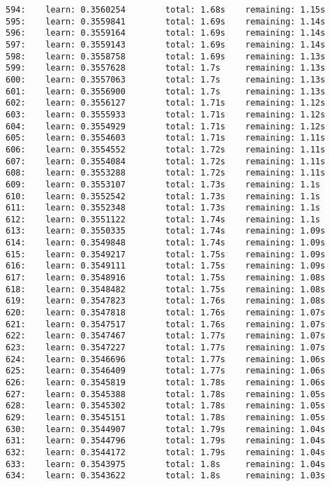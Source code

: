 \documentclass[11pt]{article}
\begin{document}
\begin{Verbatim}[commandchars=\\\{\}]
594:    learn: 0.3560254        total: 1.68s    remaining: 1.15s
595:    learn: 0.3559841        total: 1.69s    remaining: 1.14s
596:    learn: 0.3559164        total: 1.69s    remaining: 1.14s
597:    learn: 0.3559143        total: 1.69s    remaining: 1.14s
598:    learn: 0.3558758        total: 1.69s    remaining: 1.13s
599:    learn: 0.3557628        total: 1.7s     remaining: 1.13s
600:    learn: 0.3557063        total: 1.7s     remaining: 1.13s
601:    learn: 0.3556900        total: 1.7s     remaining: 1.13s
602:    learn: 0.3556127        total: 1.71s    remaining: 1.12s
603:    learn: 0.3555933        total: 1.71s    remaining: 1.12s
604:    learn: 0.3554929        total: 1.71s    remaining: 1.12s
605:    learn: 0.3554603        total: 1.71s    remaining: 1.11s
606:    learn: 0.3554552        total: 1.72s    remaining: 1.11s
607:    learn: 0.3554084        total: 1.72s    remaining: 1.11s
608:    learn: 0.3553288        total: 1.72s    remaining: 1.11s
609:    learn: 0.3553107        total: 1.73s    remaining: 1.1s
610:    learn: 0.3552542        total: 1.73s    remaining: 1.1s
611:    learn: 0.3552348        total: 1.73s    remaining: 1.1s
612:    learn: 0.3551122        total: 1.74s    remaining: 1.1s
613:    learn: 0.3550335        total: 1.74s    remaining: 1.09s
614:    learn: 0.3549848        total: 1.74s    remaining: 1.09s
615:    learn: 0.3549217        total: 1.75s    remaining: 1.09s
616:    learn: 0.3549111        total: 1.75s    remaining: 1.09s
617:    learn: 0.3548916        total: 1.75s    remaining: 1.08s
618:    learn: 0.3548482        total: 1.75s    remaining: 1.08s
619:    learn: 0.3547823        total: 1.76s    remaining: 1.08s
620:    learn: 0.3547818        total: 1.76s    remaining: 1.07s
621:    learn: 0.3547517        total: 1.76s    remaining: 1.07s
622:    learn: 0.3547467        total: 1.77s    remaining: 1.07s
623:    learn: 0.3547227        total: 1.77s    remaining: 1.07s
624:    learn: 0.3546696        total: 1.77s    remaining: 1.06s
625:    learn: 0.3546409        total: 1.77s    remaining: 1.06s
626:    learn: 0.3545819        total: 1.78s    remaining: 1.06s
627:    learn: 0.3545388        total: 1.78s    remaining: 1.05s
628:    learn: 0.3545302        total: 1.78s    remaining: 1.05s
629:    learn: 0.3545151        total: 1.78s    remaining: 1.05s
630:    learn: 0.3544907        total: 1.79s    remaining: 1.04s
631:    learn: 0.3544796        total: 1.79s    remaining: 1.04s
632:    learn: 0.3544172        total: 1.79s    remaining: 1.04s
633:    learn: 0.3543975        total: 1.8s     remaining: 1.04s
634:    learn: 0.3543622        total: 1.8s     remaining: 1.03s

\end{Verbatim}
\end{document}
